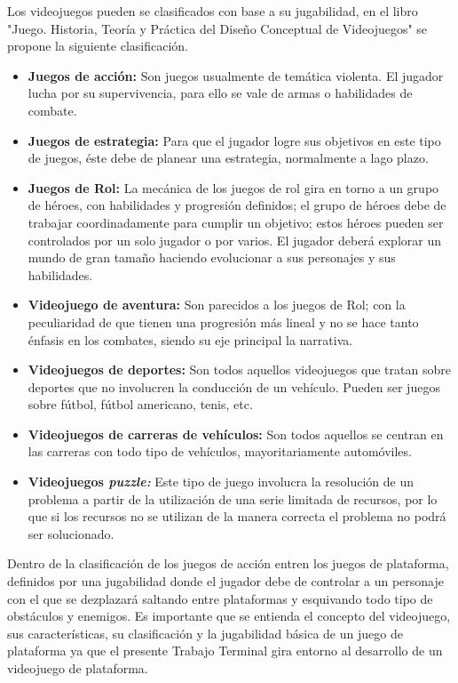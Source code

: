Los videojuegos pueden se clasificados con base a su jugabilidad, en el libro 
"Juego. Historia, Teoría y Práctica del Diseño Conceptual de 
Videojuegos"\cite{Ref_JuegoDisenio} se propone la siguiente clasificación.
	\begin{itemize}
		\item \textbf{Juegos de acción:} Son juegos usualmente de temática 
				violenta. El jugador lucha por su supervivencia, para ello se vale 
				de armas o habilidades de  combate. 
				\item \textbf{Juegos de estrategia:} Para que el jugador logre sus 
				objetivos en este tipo de juegos, éste debe de planear una estrategia, 
				normalmente a lago plazo. 
				\item \textbf{Juegos de Rol:} La mecánica de los juegos de rol gira 
				en torno a un grupo de héroes, con habilidades y progresión definidos; 
				el grupo de héroes debe de trabajar coordinadamente para cumplir un 
				objetivo; estos héroes pueden ser controlados por un solo jugador o 
				por varios. El jugador deberá explorar un mundo de gran tamaño 
				haciendo evolucionar a	sus personajes y sus habilidades. 
				\item \textbf{Videojuego de aventura:} Son parecidos a los juegos de 
				Rol; con la peculiaridad de que tienen una progresión más lineal y no 
				se hace tanto énfasis en los combates, siendo su eje principal la 
				narrativa.
				\item \textbf{Videojuegos de deportes:} Son todos aquellos videojuegos 
				que tratan sobre deportes que no involucren la conducción de un 
				vehículo. Pueden ser juegos sobre fútbol, fútbol americano, tenis, etc.
				\item \textbf{Videojuegos de carreras de vehículos:} Son todos aquellos 
				se centran en las carreras con todo tipo de vehículos, mayoritariamente 
				automóviles.
				\item \textbf{Videojuegos {\it puzzle:}} Este tipo de juego involucra 
				la resolución de un problema a partir de la utilización de una serie 
				limitada de recursos, por lo que si los recursos no se utilizan de la 
				manera correcta el problema no podrá ser solucionado.  
	\end{itemize}
	
Dentro de la clasificación de los juegos de acción entren los juegos de plataforma, 
definidos por una jugabilidad donde el jugador debe de controlar a un personaje 
con el que se dezplazará saltando entre plataformas y esquivando todo tipo de 
obstáculos y enemigos\cite{Ref_JuegoDisenio}. 
Es importante que se entienda el concepto del videojuego, sus características, 
su clasificación y la jugabilidad básica de un juego de plataforma ya que el 
presente Trabajo Terminal gira entorno al desarrollo de un videojuego de plataforma.

